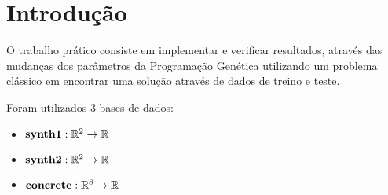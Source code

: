 \section{Introdução}

O trabalho prático consiste em implementar e verificar resultados, através das mudanças dos parâmetros da Programação Genética utilizando um problema clássico em encontrar uma solução através de dados de treino e teste.

Foram utilizados 3 bases de dados:

\begin{itemize}
	\item $\textbf{synth1}: \mathbb{R}^{2} \rightarrow \mathbb{R}$
	\item $\textbf{synth2}: \mathbb{R}^{2} \rightarrow \mathbb{R}$
	\item $\textbf{concrete}: \mathbb{R}^{8} \rightarrow \mathbb{R}$
\end{itemize}
